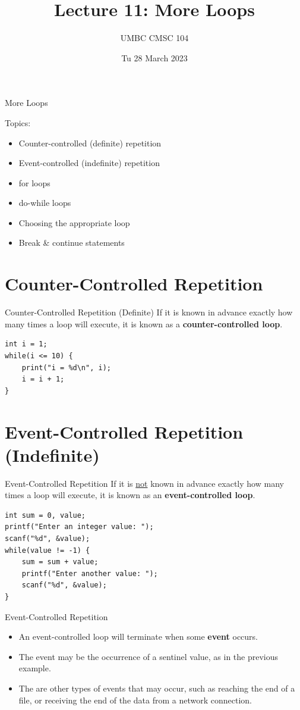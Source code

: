 \documentclass[graphics]{beamer}
\title{Lecture 11: More Loops}
\author{UMBC CMSC 104}
\date{Tu 28 March 2023}
\begin{document}
\begin{frame}{}
\centering
    More Loops
\end{frame}

\begin{frame}
    Topics:
    \begin{itemize}
        \item Counter-controlled (definite) repetition
        \item Event-controlled (indefinite) repetition
        \item for loops
        \item do-while loops
        \item Choosing the appropriate loop
        \item Break \& continue statements
    \end{itemize}
\end{frame}

\section*{Counter-Controlled Repetition}
\begin{frame}[fragile]{Counter-Controlled Repetition (Definite)}
    If it is known in advance exactly how many times a loop will execute, it is known as a \textbf{counter-controlled loop}.
    \begin{verbatim}
int i = 1;
while(i <= 10) {
    print("i = %d\n", i);
    i = i + 1;
}
    \end{verbatim}
\end{frame}

    \section*{Event-Controlled Repetition (Indefinite)}
\begin{frame}[fragile]{Event-Controlled Repetition}
    If it is \underline{not} known in advance exactly how many times a loop will execute, it is known as an \textbf{event-controlled loop}.
    \begin{verbatim}
int sum = 0, value;
printf("Enter an integer value: ");
scanf("%d", &value);
while(value != -1) {
    sum = sum + value;
    printf("Enter another value: ");
    scanf("%d", &value);
}
    \end{verbatim}
\end{frame}

\begin{frame}{Event-Controlled Repetition}
    \begin{itemize}
        \item An event-controlled loop will terminate when some \textbf{event} occurs.
        \item The event may be the occurrence of a sentinel value, as in the previous example.
        \item The are other types of events that may occur, such as reaching the end of a file, or receiving the end of the data from a network connection.
    \end{itemize}
\end{frame}
\end{document}
